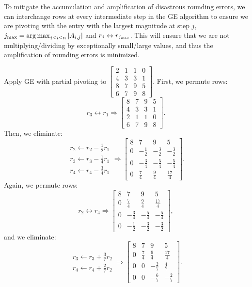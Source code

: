 To mitigate the accumulation and amplification of disastrous rounding errors, we can interchange rows at every intermediate step in the GE algorithm to ensure we are pivoting with the entry with the largest magnitude at step $j$, $j_{\rm max} = \argmax_{j\le i\le n}\abs{A_{i,j}}$ and $r_j \leftrightarrow r_{j_{\rm max}}$. This will ensure that we are not multiplying/dividing by exceptionally small/large values, and thus the amplification of rounding errors is minimized.

\begin{example}\label{eq:LastGE}
Apply GE with partial pivoting to $\begin{bmatrix} 2 & 1 & 1 & 0\\ 4 & 3 & 3 & 1\\ 8 & 7 & 9 & 5\\ 6 & 7 & 9 & 8\end{bmatrix}$. First, we permute rows:
\[
r_3\leftrightarrow r_1 \Rightarrow \begin{bmatrix} 8 & 7 & 9 & 5\\ 4 & 3 & 3 & 1\\ 2 & 1 & 1 & 0\\ 6 & 7 & 9 & 8\end{bmatrix}.
\]
Then, we eliminate:
\[
\begin{array}{c} r_2\leftarrow r_2 - \frac{1}{2}r_1\\ r_3\leftarrow r_3-\frac{1}{4}r_1\\ r_4\leftarrow r_4-\frac{3}{4}r_1\end{array} \Rightarrow \begin{bmatrix} 8 & 7 & 9 & 5\\ 0 & -\frac{1}{2} & -\frac{3}{2} & -\frac{3}{2}\\ 0 & -\frac{3}{4} & -\frac{5}{4} & -\frac{5}{4}\\ 0 & \frac{7}{4} & \frac{9}{4} & \frac{17}{4}\end{bmatrix}.
\]
Again, we permute rows:
\[
r_2\leftrightarrow r_4 \Rightarrow  \begin{bmatrix} 8 & 7 & 9 & 5\\ 0 & \frac{7}{4} & \frac{9}{4} & \frac{17}{4}\\ 0 & -\frac{3}{4} & -\frac{5}{4} & -\frac{5}{4}\\ 0 & -\frac{1}{2} & -\frac{3}{2} & -\frac{3}{2}\end{bmatrix},
\]
and we eliminate:
\[
\begin{array}{c} r_3\leftarrow r_3 + \frac{3}{7}r_2\\ r_4 \leftarrow r_4 + \frac{2}{7}r_2\end{array} \Rightarrow  \begin{bmatrix} 8 & 7 & 9 & 5\\ 0 & \frac{7}{4} & \frac{9}{4} & \frac{17}{4}\\ 0 & 0 & -\frac{2}{7} & \frac{4}{7}\\ 0 & 0 & -\frac{6}{7} & -\frac{2}{7}\end{bmatrix}.
\]
\end{example}
